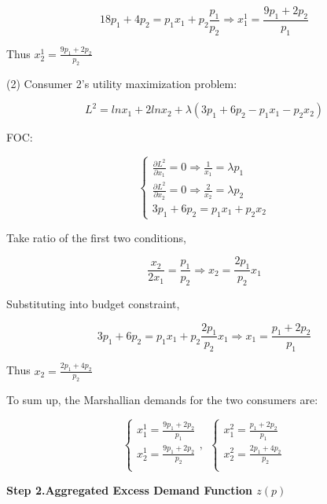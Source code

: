 \documentclass{article}
\begin{document}
$$18p_1 +4p_2 = p_1x_1 + p_2\frac{p_1}{p_2}   \Rightarrow x^1_1 =\frac{9p_1+2p_2}{p_1}$$

Thus $x^1_2 = \frac{9p_1+2p_2}{p_2}$ 

(2) Consumer 2's utility maximization problem:

\vspace{3mm}

$$L^2 = ln x_1 + 2ln x_2 + \lambda (3p_1 +6p_2 - p_1x_1 -p_2x_2) $$

FOC:

\begin{equation}
    \begin{cases}
\frac{\partial L^2}{\partial x_1} = 0  \Rightarrow \frac{1}{x_1} = \lambda p_1 \\
\frac{\partial L^2}{\partial x_2} = 0  \Rightarrow \frac{2}{x_2} = \lambda p_2 \\
3p_1 +6p_2 = p_1x_1 + p_2x_2
    \end{cases}
    \nonumber
\end{equation}

Take ratio of the first two conditions,

$$\frac{x_2}{2x_1} = \frac{p_1}{p_2} \Rightarrow x_2 = \frac{2p_1}{p_2}  x_1$$

Substituting into budget constraint,

$$3p_1 +6p_2 = p_1x_1 + p_2\frac{2p_1}{p_2}  x_1   \Rightarrow x_1 =\frac{p_1+2p_2}{p_1}$$

Thus $x_2 = \frac{2p_1+4p_2}{p_2}$ 

To sum up, the Marshallian demands for the two consumers are:


\begin{equation}
    \begin{cases}
x^1_1 = \frac{9p_1+2p_2}{p_1} \\
x^1_2 = \frac{9p_1+2p_2}{p_2}  \\
    \end{cases}
, \ \
    \begin{cases}
x^2_1 = \frac{p_1+2p_2}{p_1} \\
x^2_2 = \frac{2p_1+4p_2}{p_2}  \\
    \end{cases}
\label{eq:demand}
\end{equation}

\vspace{3mm}

\textbf{Step 2.Aggregated Excess Demand Function $z(p)$}

\vspace{3mm}
\end{document}
